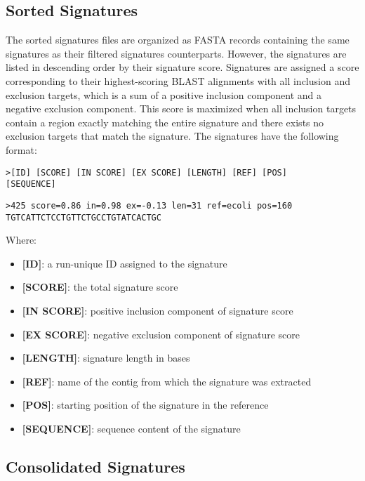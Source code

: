 \documentclass[a4paper,10pt]{article}
\begin{document}
\subsection{Sorted Signatures}

The sorted signatures files are organized as FASTA records containing the same signatures as their filtered signatures counterparts. However, the signatures are listed in descending order by their signature score. Signatures are assigned a score corresponding to their highest-scoring BLAST alignments with all inclusion and exclusion targets, which is a sum of a positive inclusion component and a negative exclusion component. This score is maximized when all inclusion targets contain a region exactly matching the entire signature and there exists no exclusion targets that match the signature. The signatures have the following format:

\begin{verbatim}
>[ID] [SCORE] [IN SCORE] [EX SCORE] [LENGTH] [REF] [POS]
[SEQUENCE]
\end{verbatim}

\begin{verbatim}
>425 score=0.86 in=0.98 ex=-0.13 len=31 ref=ecoli pos=160
TGTCATTCTCCTGTTCTGCCTGTATCACTGC
\end{verbatim}

Where:

\begin{itemize}
  \item \textbf{[ID]}: a run-unique ID assigned to the signature
  \item \textbf{[SCORE]}: the total signature score
  \item \textbf{[IN SCORE]}: positive inclusion component of signature score
  \item \textbf{[EX SCORE]}: negative exclusion component of signature score
  \item \textbf{[LENGTH]}: signature length in bases
  \item \textbf{[REF]}: name of the contig from which the signature was extracted
  \item \textbf{[POS]}: starting position of the signature in the reference
  \item \textbf{[SEQUENCE]}: sequence content of the signature
\end{itemize}

\subsection{Consolidated Signatures}
\end{document}
